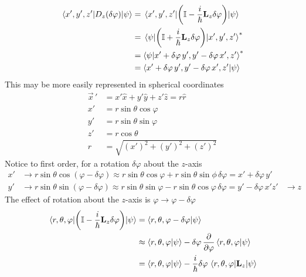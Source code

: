 \documentclass[12pt,a4paper,titlepage]{article}
\begin{document}
\begin{equation}
\begin{aligned}
\mel{x',y',z'}{D_{z}(\delta\varphi)}{\psi}&=\mel{x',y',z'}{\qty(\mathbb{I}-\frac{i}{\hbar}\vb{L}_{z}\delta\varphi)}{\psi}\\
&=\mel{\psi}{\qty(\mathbb{I}+\frac{i}{\hbar}\vb{L}_{z}\delta\varphi)}{x',y',z'}^{*}\\
&=\ip{\psi}{x'+\delta\varphi\,y',y'-\delta\varphi\,x',z'}^{*}\\
&=\ip{x'+\delta\varphi\,y',y'-\delta\varphi\,x',z'}{\psi}
\end{aligned}
\end{equation}
This may be more easily represented in spherical coordinates
\begin{equation}
\begin{aligned}
\vec{x}\,'&=x'\hat{x}+y'\hat{y}+z'\hat{z}=r\hat{r}\\
x'&=r\sin\theta\cos\varphi\\
y'&=r\sin\theta\sin\varphi\\
z'&=r\cos\theta\\
r&=\sqrt{(x')^{2}+(y')^{2}+(z')^{2}}
\end{aligned}
\end{equation}
Notice to first order, for a rotation $\delta\varphi$ about the $z$-axis
\begin{equation}
\begin{aligned}
x'&\rightarrow r\sin\theta\cos(\varphi-\delta\varphi)\approx r\sin\theta\cos\varphi+r\sin\theta\sin\phi \,\delta\varphi = x'+\delta\varphi\,y'\\
y'&\rightarrow r\sin\theta\sin(\varphi-\delta\varphi)\approx r\sin\theta\sin\varphi-r\sin\theta\cos\varphi\,\delta\varphi=y'-\delta\varphi\, x'
z'&\rightarrow z
\end{aligned}
\end{equation}
The effect of rotation about the $z$-axis is $\varphi\rightarrow\varphi-\delta\varphi$
\begin{equation}
\begin{aligned}
\mel{r,\theta,\varphi}{\qty(\mathbb{I}-\frac{i}{\hbar}\vb{L}_{z}\delta\varphi)}{\psi}&=\ip{r,\theta,\varphi-\delta\varphi}{\psi}\\
&\approx\ip{r,\theta,\varphi}{\psi}-\delta\varphi\,\pdv{\varphi}\ip{r,\theta,\varphi}{\psi}\\
&=\ip{r,\theta,\varphi}{\psi}-\frac{i}{\hbar}\delta\varphi\,\mel{r,\theta,\varphi}{\vb{L}_{z}}{\psi}
\end{aligned}
\end{equation}
\end{document}
